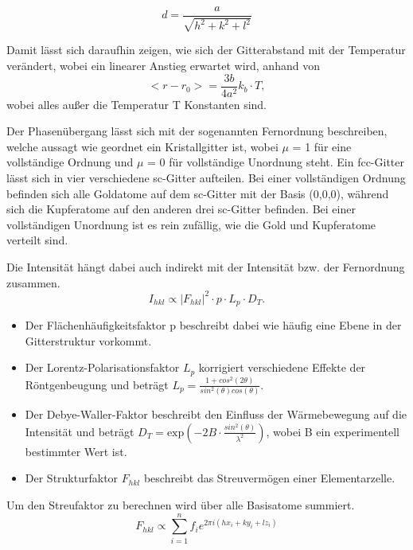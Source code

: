 \documentclass[
	a4paper,
	12pt,
	pagesize,
	ngerman
]{scrartcl}
\begin{document}
\begin{equation}
d = \frac{a}{\sqrt{h^{2}+k^{2}+l^{2}}}
\label{d}
\end{equation}

Damit lässt sich daraufhin zeigen, wie sich der Gitterabstand mit der Temperatur verändert, wobei ein linearer Anstieg erwartet wird, anhand von 
\begin{equation}
<r-r_{0}> = \frac{3 b}{4 a^{2}} k_{b} \cdot T, 
\label{Temp}
\end{equation}
wobei alles außer die Temperatur T Konstanten sind.

Der Phasenübergang lässt sich mit der sogenannten Fernordnung beschreiben, welche aussagt wie geordnet ein Kristallgitter ist, wobei $\mu$ = 1 für eine vollständige Ordnung und $\mu$ = 0 für vollständige Unordnung steht. Ein fcc-Gitter lässt sich in vier verschiedene sc-Gitter aufteilen. Bei einer vollständigen Ordnung befinden sich alle Goldatome auf dem sc-Gitter mit der Basis (0,0,0), während sich die Kupferatome auf den anderen drei sc-Gitter befinden.
Bei einer vollständigen Unordnung ist es rein zufällig, wie die Gold und Kupferatome verteilt sind.

Die Intensität hängt dabei auch indirekt mit der Intensität bzw. der Fernordnung zusammen.
\begin{equation}
I_{hkl} \propto |F_{hkl}|^{2} \cdot p \cdot L_{p} \cdot D_{T}.
\end{equation}

\begin{itemize}


\item Der Flächenhäufigkeitsfaktor p beschreibt dabei wie häufig eine Ebene in der Gitterstruktur vorkommt.

\item Der Lorentz-Polarisationsfaktor $L_{p}$ korrigiert verschiedene Effekte der Röntgenbeugung und beträgt $L_{p} =\frac{1 + cos^{2}(2 \theta)}{sin^{2}(\theta) cos(\theta)}$. 

\item Der Debye-Waller-Faktor beschreibt den Einfluss der Wärmebewegung auf die Intensität und beträgt $D_{T} = \text{exp}(-2B \cdot \frac{sin^{2}(\theta)}{\lambda^{2}})$, wobei B ein experimentell bestimmter Wert ist.

\item Der Strukturfaktor $F_{hkl}$ beschreibt das Streuvermögen einer Elementarzelle.
\end{itemize}

Um den Streufaktor zu berechnen wird über alle Basisatome summiert.
\begin{equation}
F_{hkl} \propto \sum_{i=1}^{n} f_{i} e^{2 \pi i(hx_{i} + ky_{i} + lz_{i})}
\end{equation}
\end{document}
